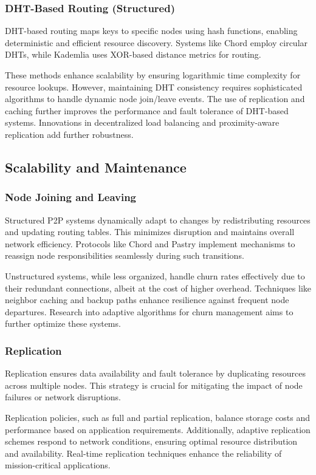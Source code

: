 \subsubsection{DHT-Based Routing (Structured)}
DHT-based routing maps keys to specific nodes using hash functions, enabling deterministic and efficient resource discovery. Systems like Chord employ circular DHTs, while Kademlia uses XOR-based distance metrics for routing.

These methods enhance scalability by ensuring logarithmic time complexity for resource lookups. However, maintaining DHT consistency requires sophisticated algorithms to handle dynamic node join/leave events. The use of replication and caching further improves the performance and fault tolerance of DHT-based systems. Innovations in decentralized load balancing and proximity-aware replication add further robustness.

\subsection{Scalability and Maintenance}

\subsubsection{Node Joining and Leaving}
Structured P2P systems dynamically adapt to changes by redistributing resources and updating routing tables. This minimizes disruption and maintains overall network efficiency. Protocols like Chord and Pastry implement mechanisms to reassign node responsibilities seamlessly during such transitions.

Unstructured systems, while less organized, handle churn rates effectively due to their redundant connections, albeit at the cost of higher overhead. Techniques like neighbor caching and backup paths enhance resilience against frequent node departures. Research into adaptive algorithms for churn management aims to further optimize these systems.

\subsubsection{Replication}
Replication ensures data availability and fault tolerance by duplicating resources across multiple nodes. This strategy is crucial for mitigating the impact of node failures or network disruptions.

Replication policies, such as full and partial replication, balance storage costs and performance based on application requirements. Additionally, adaptive replication schemes respond to network conditions, ensuring optimal resource distribution and availability. Real-time replication techniques enhance the reliability of mission-critical applications.


